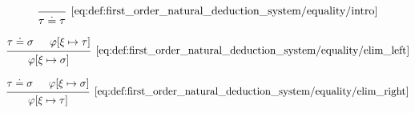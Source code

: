 \begin{definition}
\begin{thmenum}
    \begin{minipage}{0.3\textwidth}
      \begin{equation*}\taglabel[\( \doteq^+ \)]{eq:def:first_order_natural_deduction_system/equality/intro}
        \begin{prooftree}
          \infer0[\ref{eq:def:first_order_natural_deduction_system/equality/intro}]{ \tau \doteq \tau }
        \end{prooftree}
      \end{equation*}
    \end{minipage}
    \hfill
    \begin{minipage}{0.3\textwidth}
      \begin{equation*}\taglabel[\( \doteq_L^- \)]{eq:def:first_order_natural_deduction_system/equality/elim_left}
        \begin{prooftree}
          \hypo{ \tau \doteq \sigma }
          \hypo{ \varphi[\xi \mapsto \tau] }
          \infer2[\ref{eq:def:first_order_natural_deduction_system/equality/elim_left}]{ \varphi[\xi \mapsto \sigma] }
        \end{prooftree}
      \end{equation*}
    \end{minipage}
    \hfill
    \begin{minipage}{0.3\textwidth}
      \begin{equation*}\taglabel[\( \doteq_L^+ \)]{eq:def:first_order_natural_deduction_system/equality/elim_right}
        \begin{prooftree}
          \hypo{ \tau \doteq \sigma }
          \hypo{ \varphi[\xi \mapsto \sigma] }
          \infer2[\ref{eq:def:first_order_natural_deduction_system/equality/elim_right}]{ \varphi[\xi \mapsto \tau] }
        \end{prooftree}
      \end{equation*}
    \end{minipage}
  \end{thmenum}
\end{definition}

